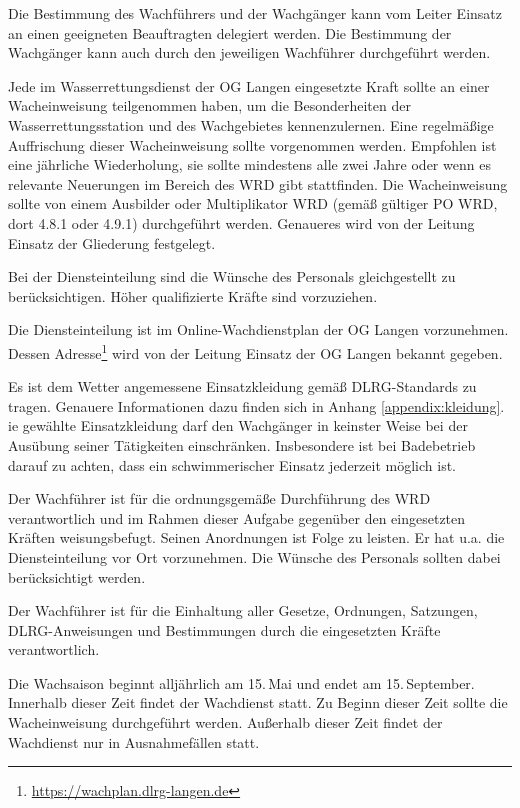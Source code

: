 Die Bestimmung des Wachführers und der Wachgänger kann vom Leiter Einsatz an einen geeigneten Beauftragten delegiert werden. Die Bestimmung der Wachgänger kann auch durch den jeweiligen Wachführer durchgeführt werden.

Jede im Wasserrettungsdienst der OG Langen eingesetzte Kraft sollte an einer Wacheinweisung teilgenommen haben, um die Besonderheiten der Wasserrettungsstation und des Wachgebietes kennenzulernen. 
Eine regelmäßige Auffrischung dieser Wacheinweisung sollte vorgenommen werden. 
Empfohlen ist eine jährliche Wiederholung, sie sollte mindestens alle zwei Jahre oder wenn es relevante Neuerungen im Bereich des WRD gibt stattfinden. 
Die Wacheinweisung sollte von einem Ausbilder oder Multiplikator WRD (gemäß gültiger PO WRD, dort 4.8.1 oder 4.9.1) durchgeführt werden. 
Genaueres wird von der Leitung Einsatz der Gliederung festgelegt.

Bei der Diensteinteilung sind die Wünsche des Personals gleichgestellt zu berücksichtigen. Höher qualifizierte Kräfte sind vorzuziehen.

Die Diensteinteilung ist im Online-Wachdienstplan der OG Langen vorzunehmen. Dessen Adresse\footnote{\url{https://wachplan.dlrg-langen.de}} wird von der Leitung Einsatz der OG Langen bekannt gegeben.

Es ist dem Wetter angemessene Einsatzkleidung gemäß DLRG-Standards zu tragen. Genauere Informationen dazu finden sich in Anhang \vref{appendix:kleidung}.
ie gewählte Einsatzkleidung darf den Wachgänger in keinster Weise bei der Ausübung seiner Tätigkeiten einschränken. Insbesondere ist bei Badebetrieb darauf zu achten, dass ein schwimmerischer Einsatz jederzeit möglich ist.

Der Wachführer ist für die ordnungsgemäße Durchführung des WRD verantwortlich und im Rahmen dieser Aufgabe gegenüber den eingesetzten Kräften weisungsbefugt. Seinen Anordnungen ist Folge zu leisten. Er hat u.a. die Diensteinteilung vor Ort vorzunehmen. Die Wünsche des Personals sollten dabei berücksichtigt werden.

Der Wachführer ist für die Einhaltung aller Gesetze, Ordnungen, Satzungen, DLRG-Anweisungen und Bestimmungen durch die eingesetzten Kräfte verantwortlich.
 
Die Wachsaison beginnt alljährlich am 15.\,Mai und endet am 15.\,September. Innerhalb dieser Zeit findet der Wachdienst statt. Zu Beginn dieser Zeit sollte die Wacheinweisung durchgeführt werden. Außerhalb dieser Zeit findet der Wachdienst nur in Ausnahmefällen statt.

